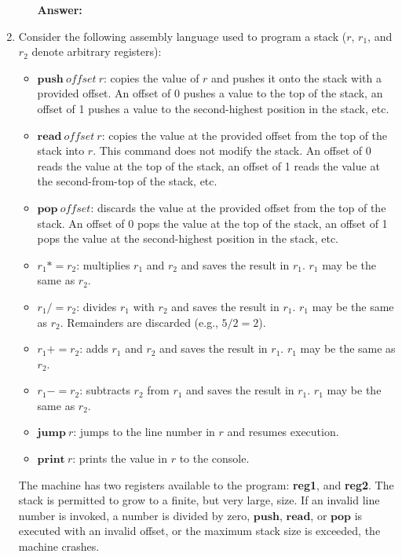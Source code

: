 \documentclass[11pt]{article}
\newcommand{\kw}[1]{\ensuremath{\mathbf{#1}}}
\newcommand{\param}[1]{\ensuremath{\mathit{#1}}}
\begin{document}
\begin{enumerate}
\begin{enumerate}
    \bigskip

    \textbf{Answer:}

\end{enumerate}

\newpage

\item Consider the following assembly language used to program a stack ($r$, $r_1$, and $r_2$ denote arbitrary registers):
    \begin{itemize}
        \item $\kw{push}\ \param{offset}\  r$: copies the value of $r$ and pushes it onto the stack with a provided offset. An offset of 0 pushes a value to the top of the stack, an offset of 1 pushes a value to the second-highest position in the stack, etc.
        \item $\kw{read}\ \param{offset}\ r$: copies the value at the provided offset from the top of the stack into $r$. This command does not modify the stack. An offset of 0 reads the value at the top of the stack, an offset of 1 reads the value at the second-from-top of the stack, etc.
        \item $\kw{pop}\ \param{offset}$: discards the value at the provided offset from the top of the stack. An offset of 0 pops the value at the top of the stack, an offset of 1 pops the value at the second-highest position in the stack, etc.
        \item $r_1 \mathbin{{*}{=}} r_2$: multiplies $r_1$ and $r_2$ and saves the result in $r_1$. $r_1$ may be the same as $r_2$.
        \item $r_1 \mathbin{{/}{=}} r_2$: divides $r_1$ with $r_2$ and saves the result in $r_1$. $r_1$ may be the same as $r_2$. Remainders are discarded (e.g., $5 / 2 = 2$).
        \item $r_1 \mathbin{{+}{=}} r_2$: adds $r_1$ and $r_2$ and saves the result in $r_1$. $r_1$ may be the same as $r_2$.
        \item $r_1 \mathbin{{-}{=}} r_2$: subtracts $r_2$ from $r_1$ and saves the result in $r_1$. $r_1$ may be the same as $r_2$.
        \item $\kw{jump}\ r$: jumps to the line number in $r$ and resumes execution.
        \item $\kw{print}\ r$: prints the value in $r$ to the console.
    \end{itemize}
The machine has two registers available to the program: \textbf{reg1}, and \textbf{reg2}. The stack is permitted to grow to a finite, but very large, size. If an invalid line number is invoked, a number is divided by zero, \kw{push}, \kw{read}, or \kw{pop} is executed with an invalid offset, or the maximum stack size is exceeded, the machine crashes.


\end{enumerate}
\end{document}
